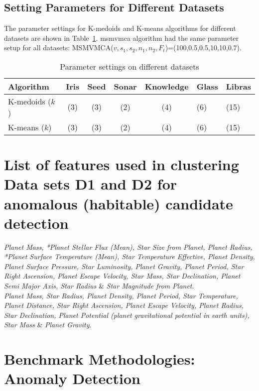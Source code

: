 \documentclass[fleqn,usenatbib]{mnras}
\begin{document}
\subsection{Setting Parameters for Different Datasets}

The parameter settings for K-medoids and K-means algorithms for different datasets are shown  in Table~\ref{table:params1}. \acrshort{msmvmca}  algorithm had the same parameter setup for all datasets: MSMVMCA($v,s_1,s_2,n_1,n_2, F_t$)=(100,0.5,0.5,10,10,0.7). 

\begin{table}
\caption{Parameter settings on different datasets}
\label{table:params1}
\begin{tabular}{l c c c c l l}
\hline
Algorithm & Iris & Seed & Sonar & Knowledge & Glass & Libras \\
 \hline
K-medoids ($k$) & (3) & (3) & (2)  &  (4) & (6) & (15)\\
\hline
K-means ($k$) & (3) & (3) & (2) & (4) & (6)& (15)\\
\hline
\end{tabular}
\end{table} 
 

\section{List of features used in clustering Data sets D1 and D2 for anomalous (habitable) candidate detection}
\label{appenix-features}

\textsl{Planet Mass, *Planet Stellar Flux (Mean), Star Size from Planet, Planet Radius, *Planet Surface Temperature (Mean), Star Temperature Effective, Planet Density, Planet Surface Pressure, Star Luminosity, Planet Gravity, Planet Period, Star Right Ascension, 
Planet Escape Velocity, Star Mass, Star Declination,
Planet Semi Major Axis, Star Radius} \& \textsl{Star Magnitude from Planet}.
\vskip 0.1in
 \\
\textsl{Planet Mass, Star Radius, Planet Density, Planet Period, Star Temperature, Planet Distance, Star Right Ascension, Planet Escape  Velocity, Planet Radius, Star Declination, Planet Potential (planet gravitational potential in earth units), Star Mass} \& \textsl{Planet Gravity}.

\section{Benchmark Methodologies: Anomaly Detection}\label{appendix:methodologies}
\end{document}
